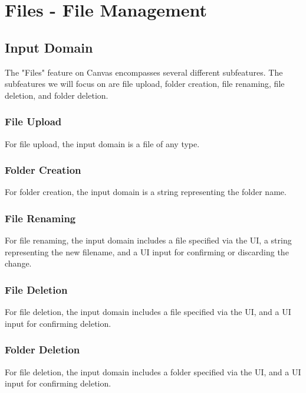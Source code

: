 \documentclass[10pt,letterpaper]{article}
\begin{document}
\newpage
\section{Files - File Management}
\subsection{Input Domain}
The "Files" feature on Canvas encompasses several different subfeatures. The subfeatures we will focus on are file upload, folder creation, file renaming, file deletion, and folder deletion.

\subsubsection{File Upload}
For file upload, the input domain is a file of any type. 

\subsubsection{Folder Creation}
For folder creation, the input domain is a string representing the folder name.

\subsubsection{File Renaming}
For file renaming, the input domain includes a file specified via the UI, a string representing the new filename, and a UI input for confirming or discarding the change.

\subsubsection{File Deletion}
For file deletion, the input domain includes a file specified via the UI, and a UI input for confirming deletion.

\subsubsection{Folder Deletion}
For file deletion, the input domain includes a folder specified via the UI, and a UI input for confirming deletion.
\end{document}
